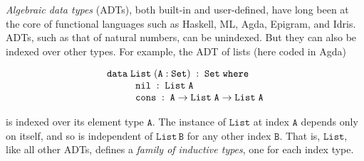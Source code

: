 \documentclass{lmcs}
\theoremstyle{plain}\newtheorem{satz}[thm]{Satz}
\begin{document}
{\em Algebraic data types} (ADTs), both built-in and user-defined,
have long been at the core of functional languages such as Haskell,
ML, Agda, Epigram, and Idris. ADTs, such as that of natural numbers,
can be unindexed. But they can also be indexed over other types. For
example, the ADT of lists (here coded in Agda)

{\small
\[\begin{array}{l}
\mathtt{data\; List \;(A : Set)\;:\;Set\;where}\\
\hspace*{0.4in}\mathtt{nil\;:\; List\;A}\\
\hspace*{0.4in}\mathtt{cons\;:\;A \rightarrow List\;A \rightarrow List\;A}
\end{array}\]}

\noindent
is indexed over its element type $\mathtt{A}$.  The instance of
$\mathtt{List}$ at index $\mathtt{A}$ depends only on itself, and so is
independent of $\mathtt{List\,B}$ for any other index $\mathtt{B}$.
That is, $\mathtt{List}$, like all other ADTs, defines a {\em family
  of inductive types}, one for each index type.
\end{document}
